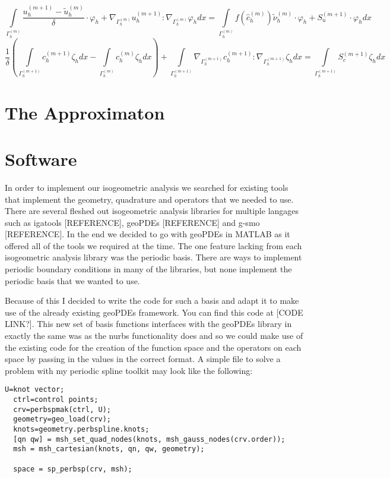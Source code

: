 \documentclass[a4paper, 11pt]{article}
\begin{document}
\begin{equation}
  \int\limits_{\Gamma^{\left(m\right)}_h}\frac{u_h^{\left(m+1\right)}-\widetilde{u}_h^{\left(m\right)}}{\delta}\cdot\varphi_h + \nabla_{\Gamma_h^{\left(m\right)}}u_h^{\left(m+1\right)}:\nabla_{\Gamma_h^{\left(m\right)}}\varphi_{h}dx = \int\limits_{\Gamma^{\left(m\right)}_h}f(\hat{c}_h^{\left(m\right)})\widetilde{\nu}_h^{\left(m\right)}\cdot\varphi_h + S_u^{\left(m+1\right)}\cdot\varphi_hdx
\end{equation}
\begin{equation}
  \frac{1}{\delta}\left(\int\limits_{\Gamma_h^{\left(m+1\right)}}c_h^{\left(m+1\right)}\zeta_hdx - \int\limits_{\Gamma_h^{\left(m\right)}}c_h^{\left(m\right)}\zeta_hdx\right) + \int\limits_{\Gamma_h^{\left(m+1\right)}}\nabla_{\Gamma_h^{\left(m+1\right)}}c_{h}^{\left(m+1\right)}:\nabla_{\Gamma_h^{\left(m+1\right)}}\zeta_{h}dx = \int\limits_{\Gamma_h^{\left(m+1\right)}}S_c^{\left(m+1\right)}\zeta_hdx
\end{equation}

\pagebreak
\section{The Approximaton}

\pagebreak
\section{Software}
In order to implement our isogeometric analysis we searched for existing tools that implement the geometry, quadrature and operators that we needed to use. There are several fleshed out isogeometric analysis libraries for multiple langages such as igatools [REFERENCE], geoPDEs [REFERENCE] and g-smo [REFERENCE]. In the end we decided to go with geoPDEs in MATLAB as it offered all of the tools we required at the time. The one feature lacking from each isogeometric analysis library was the periodic basis. There are ways to implement periodic boundary conditions in many of the libraries, but none implement the periodic basis that we wanted to use.

Because of this I decided to write the code for such a basis and adapt it to make use of the already existing geoPDEs framework. You can find this code at [CODE LINK?]. This new set of basis functions interfaces with the geoPDEs library in exactly the same was as the nurbs functionality does and so we could make use of the existing code for the creation of the function space and the operators on each space by passing in the values in the correct format. A simple file to solve a problem with my periodic spline toolkit may look like the following:
\begin{lstlisting}[frame=single]
  U=knot vector;
  ctrl=control points;
  crv=perbspmak(ctrl, U);
  geometry=geo_load(crv);
  knots=geometry.perbspline.knots;
  [qn qw] = msh_set_quad_nodes(knots, msh_gauss_nodes(crv.order));
  msh = msh_cartesian(knots, qn, qw, geometry);

  space = sp_perbsp(crv, msh);
\end{lstlisting}
\end{document}
